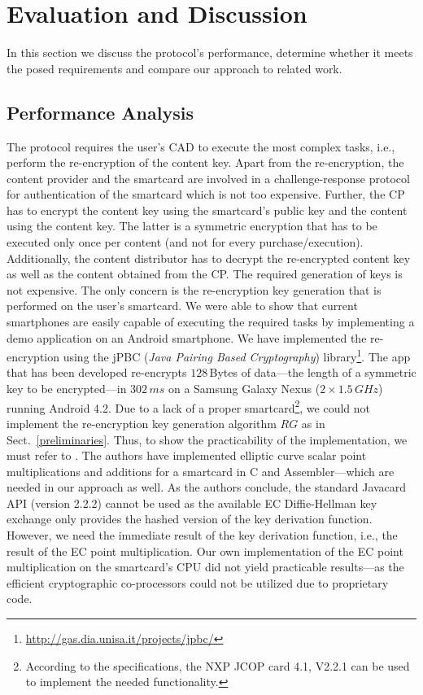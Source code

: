 \documentclass{llncs}
\newcommand{\refSec}[1]{Sect.~\ref{#1}}
\begin{document}
\section{Evaluation and Discussion} \label{evaluation}

In this section we discuss the protocol's performance, determine whether it meets the posed requirements and compare our approach to related work. 


\subsection{Performance Analysis} \label{performance_analysis}



The protocol requires the user's CAD to execute the most complex tasks, i.e., perform the re-encryption of the content key. Apart from the re-encryption, the content provider and the smartcard are involved in a challenge-response protocol for authentication of the smartcard which is not too expensive. Further, the CP has to encrypt the content key using the smartcard's public key and the content using the content key. The latter is a symmetric encryption that has to be executed only once per content (and not for every purchase/execution). Additionally, the content distributor has to decrypt the re-encrypted content key as well as the content obtained from the CP. The required generation of keys is not expensive. The only concern is the re-encryption key generation that is performed on the user's smartcard. We were able to show that current smartphones are easily capable of executing the required tasks by implementing a demo application on an Android smartphone. We have implemented the re-encryption using the jPBC (\emph{Java Pairing Based Cryptography}) library\footnote{\url{http://gas.dia.unisa.it/projects/jpbc/}}. The app that has been developed re-encrypts $128\,$Bytes of data---the length of a symmetric key to be encrypted---in $302\,ms$ on a Samsung Galaxy Nexus ($2 \times 1.5\,GHz$) running Android 4.2. Due to a lack of a proper smartcard\footnote{According to the specifications, the NXP JCOP card 4.1, V2.2.1 can be used to implement the needed functionality.}, we could not implement the re-encryption key generation algorithm $RG$ as in \refSec{preliminaries}. Thus, to show the practicability of the implementation, we must refer to \cite{smartcard}. The authors have implemented elliptic curve scalar point multiplications and additions for a smartcard in C and Assembler---which are needed in our approach as well. As the authors conclude, the standard Javacard API (version 2.2.2) cannot be used as the available EC Diffie-Hellman key exchange only provides the hashed version of the key derivation function. \cite{smartcard} However, we need the immediate result of the key derivation function, i.e., the result of the EC point multiplication. Our own implementation of the EC point multiplication on the smartcard's CPU did not yield practicable results---as the efficient cryptographic co-processors could not be utilized due to proprietary code.
\end{document}
